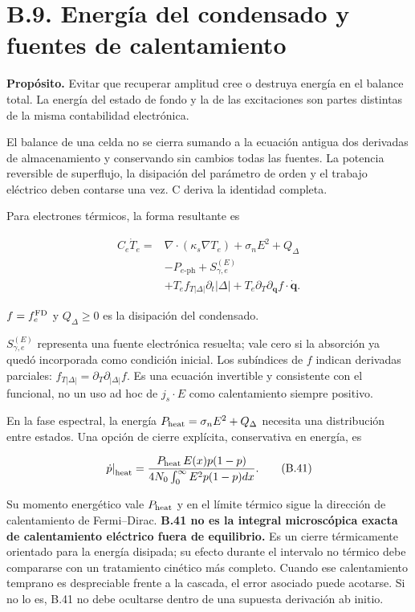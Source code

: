 \documentclass[
  spanish,
  10pt,
  a4paper,
]{article}
\begin{document}
\section{B.9. Energía del condensado y fuentes de
calentamiento}\label{b.9.-energuxeda-del-condensado-y-fuentes-de-calentamiento}

\textbf{Propósito.} Evitar que recuperar amplitud cree o destruya
energía en el balance total. La energía del estado de fondo y la de las
excitaciones son partes distintas de la misma contabilidad electrónica.

El balance de una celda no se cierra sumando a la ecuación antigua dos
derivadas de almacenamiento y conservando sin cambios todas las fuentes.
La potencia reversible de superflujo, la disipación del parámetro de
orden y el trabajo eléctrico deben contarse una vez. C deriva la
identidad completa.

Para electrones térmicos, la forma resultante es

\[
\begin{aligned}
C_e\dot T_e={}&\nabla\cdot(\kappa_s\nabla T_e)
+\sigma_nE^2+Q_\Delta\\
&-P_{e\text{-ph}}+S_{\gamma,e}^{(E)}\\
&+T_e f_{T|\Delta|}\partial_t|\Delta|+T_e\partial_T\partial_{\mathbf q}f\cdot\dot{\mathbf q}.
\end{aligned}
\tag{B.40}
\]

\(f=f_e^{\rm FD}\) y \(Q_\Delta\geq0\) es la disipación del condensado.

\(S_{\gamma,e}^{(E)}\) representa una fuente electrónica resuelta; vale
cero si la absorción ya quedó incorporada como condición inicial. Los
subíndices de \(f\) indican derivadas parciales:
\(f_{T|\Delta|}=\partial_T\partial_{|\Delta|}f\). Es una ecuación
invertible y consistente con el funcional, no un uso ad hoc de
\(j_s\cdot E\) como calentamiento siempre positivo.

En la fase espectral, la energía \(P_{\rm heat}=\sigma_nE^2+Q_\Delta\)
necesita una distribución entre estados. Una opción de cierre explícita,
conservativa en energía, es

\[
\left.\dot p\right|_{\rm heat}
=\frac{P_{\rm heat}\,E(x)p(1-p)}
{4N_0\int_0^\infty E^2p(1-p)dx}. \tag{B.41}
\]

Su momento energético vale \(P_{\rm heat}\) y en el límite térmico sigue
la dirección de calentamiento de Fermi--Dirac. \textbf{B.41 no es la
integral microscópica exacta de calentamiento eléctrico fuera de
equilibrio.} Es un cierre térmicamente orientado para la energía
disipada; su efecto durante el intervalo no térmico debe compararse con
un tratamiento cinético más completo. Cuando ese calentamiento temprano
es despreciable frente a la cascada, el error asociado puede acotarse.
Si no lo es, B.41 no debe ocultarse dentro de una supuesta derivación ab
initio.
\end{document}
